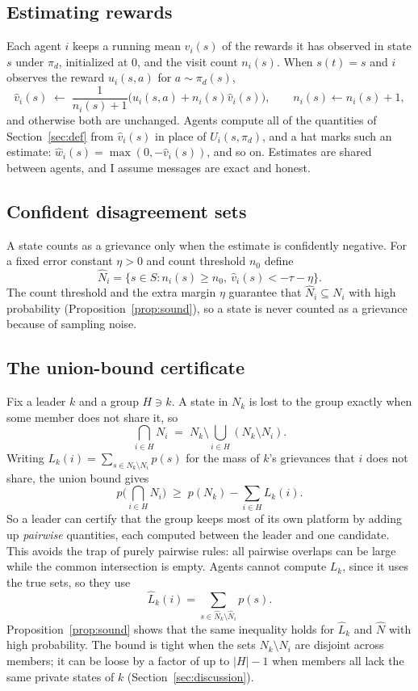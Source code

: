 \documentclass[11pt]{article}
\theoremstyle{plain}
\theoremstyle{definition}
\theoremstyle{remark}
\begin{document}
\subsection{Estimating rewards}
Each agent $i$ keeps a running mean $\hat v_i(s)$ of the rewards it has observed in state $s$ under $\pi_d$, initialized at $0$, and the visit count $n_i(s)$.
When $s(t)=s$ and $i$ observes the reward $u_i(s,a)$ for $a\sim\pi_d(s)$,
\[ \hat v_i(s) \;\leftarrow\; \frac{1}{n_i(s)+1}\Big(u_i(s, a) + n_i(s)\hat v_i(s)\Big), \qquad n_i(s)\leftarrow n_i(s)+1, \]
and otherwise both are unchanged. Agents compute all of the quantities of Section~\ref{sec:def} from $\hat v_i(s)$ in place of $U_i(s,\pi_d)$,
and a hat marks such an estimate: $\hat w_i(s)=\max(0,-\hat v_i(s))$, and so on.
Estimates are shared between agents, and I assume messages are exact and honest.
 
\subsection{Confident disagreement sets}
A state counts as a grievance only when the estimate is confidently negative. For a fixed error constant $\eta > 0$ and count threshold $n_0$ define
\[ \hat{N}_i = \{ s \in S : n_i(s) \geq n_0,\ \hat{v}_i(s) < -\tau - \eta \}. \]
The count threshold and the extra margin $\eta$ guarantee that $\hat N_i\subseteq N_i$ with high probability (Proposition~\ref{prop:sound}), so a state is never
counted as a grievance because of sampling noise.
 
\subsection{The union-bound certificate}
Fix a leader $k$ and a group $H\ni k$. A state in $N_k$ is lost to the group exactly when some member does not share it, so
\[ \bigcap_{i\in H}N_i \;=\; N_k \setminus \bigcup_{i \in H}(N_k\setminus N_i). \]
Writing $L_k(i)=\sum_{s\in N_k\setminus N_i}p(s)$ for the mass of $k$'s grievances that $i$ does not share, the union bound gives
\begin{equation}\label{eq:ub}
p\Big(\bigcap_{i \in H}N_i\Big)\;\ge\; p(N_k)-\sum_{i\in H}L_k(i).
\end{equation}
So a leader can certify that the group keeps most of its own platform by adding up \emph{pairwise} quantities, each computed between the leader and one candidate.
This avoids the trap of purely pairwise rules: all pairwise overlaps can be large while the common intersection is empty.
Agents cannot compute $L_k$, since it uses the true sets, so they use
\[ \hat{L}_k(i)=\sum_{s \in \hat{N}_k \setminus \hat{N}_i}p(s). \]
Proposition~\ref{prop:sound} shows that the same inequality holds for $\hat L_k$ and $\hat N$ with high probability.
The bound is tight when the sets $N_k\setminus N_i$ are disjoint across members; it can be loose by a factor of up to $|H|-1$ when members all lack the same private states of $k$ (Section~\ref{sec:discussion}).
 
\end{document}
